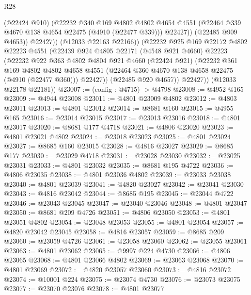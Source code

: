 \begin{lexlean}{R28}
\begin{coremodule}
                  (@22424 @910)
                  (@22232
                    @340
                    @169
                    @4802
                    @4802
                    @4654
                    @4551
                    (@22464 @339 @4670 @138 @4654 @22475 (@4910 (@22477 @339)))
                    @22427))
                (@22485 @909 @4653))
              @22427))
          (@12033 @22163 @22166))
        (@22232
          @925
          @169
          @22172
          @4802
          @22223
          @4551
          (@22439
            @924
            @4805
            @22171
            (@4548 @921 @4660)
            @22223
            (@22232
              @922
              @363
              @4802
              @4804
              @921
              @4660
              (@22424 @921)
              (@22232
                @361
                @169
                @4802
                @4802
                @4658
                @4551
                (@22464 @360 @4670 @138 @4658 @22475 (@4910 (@22477 @360)))
                @22427))
            (@22485 @920 @4657))
          @22427))
      (@12033 @22178 @22181))
@23007 := (config : @4715) -> @4798
@23008 := @4952 @165
@23009 := @4944 @23008
@23011 := @4801 @23009 @4802
@23012 := @4803 @23011
@23013 := @4801 @23012
@23014 := @8681 @160
@23015 := @4955 @165
@23016 := @23014 @23015
@23017 := @23013 @23016
@23018 := @4801 @23017
@23020 := @8681 @177 @4718
@23021 := @4806 @23020
@23023 := @4801 @23021 @4802
@23024 := @23018 @23023
@23025 := @4801 @23024
@23027 := @8685 @160 @23015
@23028 := @4816 @23027
@23029 := @8685 @177
@23030 := @23029 @4718
@23031 := @23028 @23030
@23032 := @23025 @23031
@23033 := @4801 @23032
@23035 := @8681 @195 @4722
@23036 := @4806 @23035
@23038 := @4801 @23036 @4802
@23039 := @23033 @23038
@23040 := @4801 @23039
@23041 := @4820 @23027
@23042 := @23041 @23030
@23043 := @4816 @23042
@23044 := @8685 @195
@23045 := @23044 @4722
@23046 := @23043 @23045
@23047 := @23040 @23046
@23048 := @4801 @23047
@23050 := @8681 @209 @4726
@23051 := @4806 @23050
@23053 := @4801 @23051 @4802
@23054 := @23048 @23053
@23055 := @4801 @23054
@23057 := @4820 @23042 @23045
@23058 := @4816 @23057
@23059 := @8685 @209
@23060 := @23059 @4726
@23061 := @23058 @23060
@23062 := @23055 @23061
@23063 := @4801 @23062
@23065 := @9997 @224 @4730
@23066 := @4806 @23065
@23068 := @4801 @23066 @4802
@23069 := @23063 @23068
@23070 := @4801 @23069
@23072 := @4820 @23057 @23060
@23073 := @4816 @23072
@23074 := @10001 @224
@23075 := @23074 @4730
@23076 := @23073 @23075
@23077 := @23070 @23076
@23078 := @4801 @23077

\end{coremodule}
\end{lexlean}
